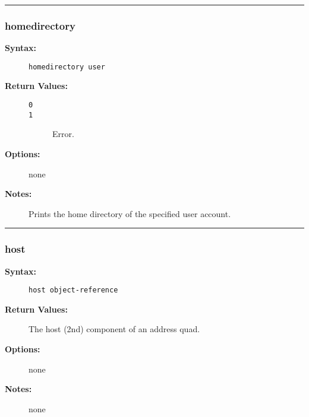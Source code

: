 \hrule
\subsubsection{homedirectory}

\begin{description}
\item[{\bf Syntax:}] \mbox{}

{\tt homedirectory user}

\item[{\bf Return Values:}] \mbox{}

\begin{description}
\item[{\tt 0}] \mbox{}



\item[{\tt 1}] \mbox{}

Error.

\end{description}


\item[{\bf Options:}] \mbox{}

none  

\item[{\bf Notes:}] \mbox{}

Prints the home directory of the specified 
user account.

\end{description}


\hrule
\subsubsection{host}

\begin{description}
\item[{\bf Syntax:}] \mbox{}

{\tt host object-reference}

\item[{\bf Return Values:}] \mbox{}

The host (2nd) component of an 
address quad.

\item[{\bf Options:}] \mbox{}

none  

\item[{\bf Notes:}] \mbox{}

none  

\end{description}



